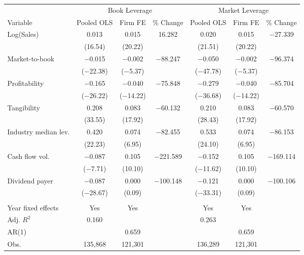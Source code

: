 \begin{tabular}{l*{6}{c}}
\toprule
 & \multicolumn{3}{c}{Book Leverage} & \multicolumn{3}{c}{Market Leverage} \\ \cmidrule(lr){2-4} \cmidrule(lr){5-7}
Variable & Pooled OLS & Firm FE & \% Change & Pooled OLS & Firm FE & \% Change \\ \midrule
Log(Sales)  &       0.013&       0.015&      16.282&       0.020&       0.015&   $-$27.339\\
            &     (16.54)&     (20.22)&            &     (21.51)&     (20.22)&            \\
\addlinespace
Market-to-book&    $-$0.015&    $-$0.002&   $-$88.247&    $-$0.050&    $-$0.002&   $-$96.374\\
            &  ($-$22.38)&   ($-$5.37)&            &  ($-$47.78)&   ($-$5.37)&            \\
\addlinespace
Profitability&    $-$0.165&    $-$0.040&   $-$75.848&    $-$0.279&    $-$0.040&   $-$85.704\\
            &  ($-$26.22)&  ($-$14.22)&            &  ($-$36.68)&  ($-$14.22)&            \\
\addlinespace
Tangibility &       0.208&       0.083&   $-$60.132&       0.210&       0.083&   $-$60.570\\
            &     (33.55)&     (17.92)&            &     (28.43)&     (17.92)&            \\
\addlinespace
Industry median lev.&       0.420&       0.074&   $-$82.455&       0.533&       0.074&   $-$86.153\\
            &     (22.23)&      (6.95)&            &     (24.10)&      (6.95)&            \\
\addlinespace
Cash flow vol.&    $-$0.087&       0.105&  $-$221.589&    $-$0.152&       0.105&  $-$169.114\\
            &   ($-$7.71)&     (10.10)&            &  ($-$11.62)&     (10.10)&            \\
\addlinespace
Dividend payer&    $-$0.087&       0.000&  $-$100.148&    $-$0.121&       0.000&  $-$100.106\\
            &  ($-$28.67)&      (0.09)&            &  ($-$33.31)&      (0.09)&            \\
\\
Year fixed effects&         Yes&         Yes&            &         Yes&         Yes&            \\
Adj. $ R^2$ &       0.160&            &            &       0.263&            &            \\
AR(1)       &            &       0.659&            &            &       0.659&            \\
Obs.        &     135,868&     121,301&            &     136,289&     121,301&            \\
\bottomrule
\end{tabular}
